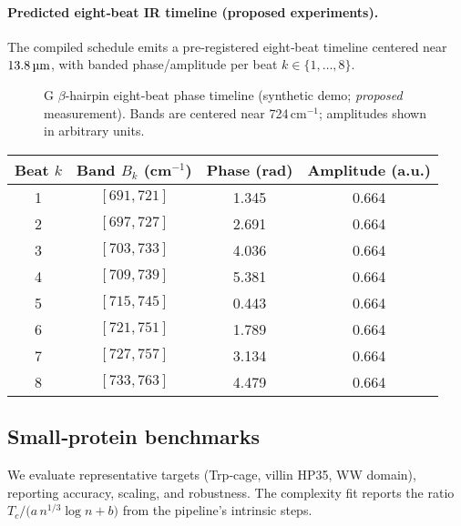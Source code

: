 \documentclass[12pt,a4paper]{article}
\begin{document}
\paragraph{Predicted eight‑beat IR timeline (proposed experiments).}
The compiled schedule emits a pre‑registered eight‑beat timeline centered near $13.8\,\text{\textmu m}$, with banded phase/amplitude per beat $k\in\{1,\dots,8\}$.
\begin{figure}[h]
\centering
{}
\caption{G $\beta$‑hairpin eight‑beat phase timeline (synthetic demo; \emph{proposed} measurement). Bands are centered near 724\,cm$^{-1}$; amplitudes shown in arbitrary units.}
\end{figure}
\begin{center}
\renewcommand{\arraystretch}{1.15}
\begin{tabular}{@{}cccc@{}}
\toprule
Beat $k$ & Band $B_k$ (cm$^{-1}$) & Phase (rad) & Amplitude (a.u.) \\
\midrule
1 & $[691, 721]$ & 1.345 & 0.664 \\
2 & $[697, 727]$ & 2.691 & 0.664 \\
3 & $[703, 733]$ & 4.036 & 0.664 \\
4 & $[709, 739]$ & 5.381 & 0.664 \\
5 & $[715, 745]$ & 0.443 & 0.664 \\
6 & $[721, 751]$ & 1.789 & 0.664 \\
7 & $[727, 757]$ & 3.134 & 0.664 \\
8 & $[733, 763]$ & 4.479 & 0.664 \\
\bottomrule
\end{tabular}
\end{center}

\subsection{Small‑protein benchmarks}
We evaluate representative targets (Trp‑cage, villin HP35, WW domain), reporting accuracy, scaling, and robustness. The complexity fit reports the ratio $T_c / \bigl(a\,n^{1/3}\log n + b\bigr)$ from the pipeline's intrinsic steps.
\end{document}
